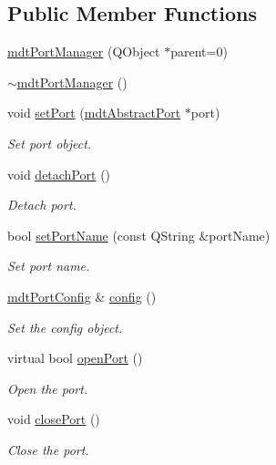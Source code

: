 \subsection*{Public Member Functions}
\begin{DoxyCompactItemize}
\item 
\hyperlink{classmdt_port_manager_a5ec36523089b7528d973e29cdbc64d01}{mdtPortManager} (QObject $\ast$parent=0)
\item 
\hyperlink{classmdt_port_manager_adf797f8fd7a3ffdc000890a224e4c1b6}{$\sim$mdtPortManager} ()
\item 
void \hyperlink{classmdt_port_manager_afcd156b2d0c9d340999935efb6cd8cb6}{setPort} (\hyperlink{classmdt_abstract_port}{mdtAbstractPort} $\ast$port)
\begin{DoxyCompactList}\small\item\em Set port object. \end{DoxyCompactList}\item 
void \hyperlink{classmdt_port_manager_a608210f908d6ac53ced36f5cf9a783f9}{detachPort} ()
\begin{DoxyCompactList}\small\item\em Detach port. \end{DoxyCompactList}\item 
bool \hyperlink{classmdt_port_manager_a647f85027ac2ed695a88f23c9f9167eb}{setPortName} (const QString \&portName)
\begin{DoxyCompactList}\small\item\em Set port name. \end{DoxyCompactList}\item 
\hyperlink{classmdt_port_config}{mdtPortConfig} \& \hyperlink{classmdt_port_manager_a9cf3ea2da38f81682695b37448712ffd}{config} ()
\begin{DoxyCompactList}\small\item\em Set the config object. \end{DoxyCompactList}\item 
virtual bool \hyperlink{classmdt_port_manager_aab594613e8985590c835194efbc27b5e}{openPort} ()
\begin{DoxyCompactList}\small\item\em Open the port. \end{DoxyCompactList}\item 
void \hyperlink{classmdt_port_manager_ace8065f1f5083041ee7f65c2892bc77d}{closePort} ()
\begin{DoxyCompactList}\small\item\em Close the port. \end{DoxyCompactList}\item 

\end{DoxyCompactItemize}
